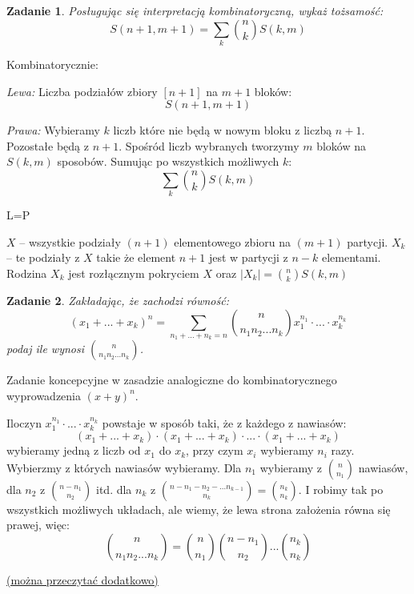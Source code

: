 \documentclass{mwbk}
\newtheorem{zad}{Zadanie}[chapter]
\begin{document}
\begin{zad}
    Posługując się interpretacją kombinatoryczną, wykaż tożsamość:
    \[S(n+1,m+1) = \sum_k \binom{n}{k}S(k,m)\]
\end{zad}
\begin{mdframed}
    Kombinatorycznie:

    \textit{Lewa:}
    Liczba podziałów zbiory $\left[n+1\right]$ na $m+1$ bloków: \[S(n+1,m+1)\]

    \textit{Prawa:}
    Wybieramy $k$ liczb które nie będą w nowym bloku z liczbą $n+1$.
    Pozostałe będą z $n+1$. Spośród liczb wybranych tworzymy $m$ bloków
    na $S(k,m)$ sposobów. Sumując po wszystkich możliwych $k$:
    \[\sum_k \binom{n}{k}S(k,m)\]

    \begin{center}
        L=P
    \end{center}

\end{mdframed}
\begin{mdframed}

    $X$ -- wszystkie podziały $(n+1)$ elementowego zbioru na $(m+1)$ partycji.
    $X_k$ -- te podziały z $X$ takie że element $n+1$ jest w partycji z $n-k$ elementami.
    Rodzina $X_k$ jest rozłącznym pokryciem $X$ oraz $|X_k| = \binom{n}{k}S(k,m)$
\end{mdframed}



\begin{zad}
    Zakładając, że zachodzi równość:
    \[
        (x_1 + ... + x_k)^n = \sum_{n_1+...+n_k=n}\binom{n}{n_1 n_2 ... n_k}x_1^{n_1}\cdot...\cdot x_k^{n_k}
    \]
    podaj ile wynosi $\binom{n}{n_1 n_2 ... n_k}$.
\end{zad}
\begin{mdframed}
Zadanie koncepcyjne w zasadzie analogiczne do kombinatorycznego wyprowadzenia
$(x+y)^n$.

Iloczyn $x_1^{n_1}\cdot ... \cdot x_k^{n_k}$ powstaje w sposób taki, że z każdego z nawiasów:
\[(x_1 + ... + x_k) \cdot (x_1 + ... + x_k) \cdot ... \cdot (x_1 + ... + x_k)\]
wybieramy jedną z liczb od $x_1$ do $x_k$, przy czym $x_i$ wybieramy
$n_i$ razy.
Wybierzmy z których nawiasów wybieramy. Dla $n_1$ wybieramy z $\binom{n}{n_1}$
nawiasów, dla $n_2$ z $\binom{n-n_1}{n_2}$ itd. dla $n_k$ z
$\binom{n-n_1-n_2-...n_{k-1}}{n_k} = \binom{n_k}{n_k}$.
I robimy tak po wszystkich możliwych układach, ale wiemy, że lewa
strona założenia równa się prawej, więc:
\[
    \binom{n}{n_1 n_2 ... n_k} = \binom{n}{n_1} \binom{n-n_1}{n_2} ... \binom{n_k}{n_k}
\]

\begin{center}\href{https://lidicky.name/oldteaching/20.569X/l03%20-%20Binomial%20Theorem.pdf}{(można przeczytać dodatkowo)}\end{center}
\end{mdframed}
\end{document}
